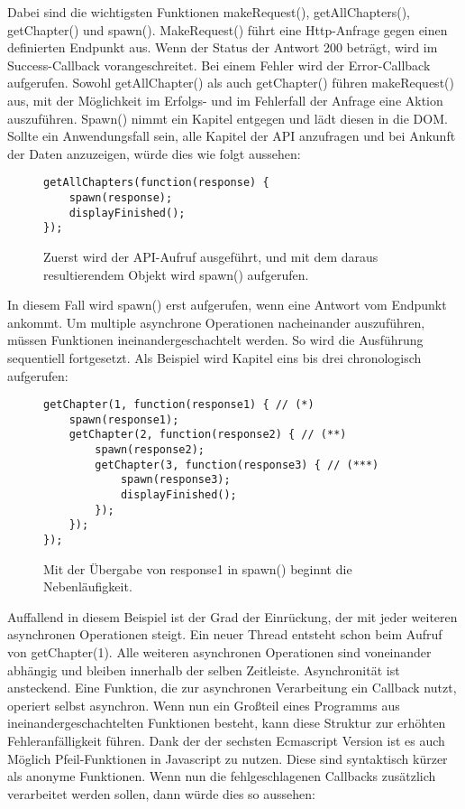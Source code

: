 \noindent
Dabei sind die wichtigsten Funktionen makeRequest(), getAllChapters(), getChapter() und spawn(). MakeRequest() führt eine Http-Anfrage gegen einen definierten Endpunkt aus. Wenn der Status der Antwort 200 beträgt, wird im Success-Callback vorangeschreitet. Bei einem Fehler wird der Error-Callback aufgerufen. Sowohl getAllChapter() als auch getChapter() führen makeRequest() aus, mit der Möglichkeit im Erfolgs- und im Fehlerfall der Anfrage eine Aktion auszuführen. Spawn() nimmt ein Kapitel entgegen und lädt diesen in die DOM. Sollte ein Anwendungsfall sein, alle Kapitel der API anzufragen und bei Ankunft der Daten anzuzeigen, würde dies wie folgt aussehen:

\begin{figure}[H]
\begin{lstlisting}[basicstyle=\small]
getAllChapters(function(response) {
    spawn(response);
    displayFinished();
});
\end{lstlisting}
\caption{Zuerst wird der API-Aufruf ausgeführt, und mit dem daraus resultierendem Objekt wird spawn() aufgerufen.}
\end{figure}

\noindent
In diesem Fall wird spawn() erst aufgerufen, wenn eine Antwort vom Endpunkt ankommt. Um multiple asynchrone Operationen nacheinander auszuführen, müssen Funktionen ineinandergeschachtelt werden. So wird die Ausführung sequentiell fortgesetzt. Als Beispiel wird Kapitel eins bis drei chronologisch aufgerufen:

\begin{figure}[H]
\begin{lstlisting}[basicstyle=\small]
getChapter(1, function(response1) { // (*)
    spawn(response1);
    getChapter(2, function(response2) { // (**)
        spawn(response2);
        getChapter(3, function(response3) { // (***)
            spawn(response3);
            displayFinished();
        });
    });
});
\end{lstlisting}
\caption{Mit der Übergabe von response1 in spawn() beginnt die Nebenläufigkeit.}
\end{figure}

\noindent
Auffallend in diesem Beispiel ist der Grad der Einrückung, der mit jeder weiteren asynchronen Operationen steigt. Ein neuer Thread entsteht schon beim Aufruf von getChapter(1). Alle weiteren asynchronen Operationen sind voneinander abhängig und bleiben innerhalb der selben Zeitleiste. Asynchronität ist ansteckend. Eine Funktion, die zur asynchronen Verarbeitung ein Callback nutzt, operiert selbst asynchron. Wenn nun ein Großteil eines Programms aus ineinandergeschachtelten Funktionen besteht, kann diese Struktur zur erhöhten Fehleranfälligkeit führen. Dank der der sechsten Ecmascript Version ist es auch Möglich Pfeil-Funktionen in Javascript zu nutzen. Diese sind syntaktisch kürzer als anonyme Funktionen. Wenn nun die fehlgeschlagenen Callbacks zusätzlich verarbeitet werden sollen, dann würde dies so aussehen:

